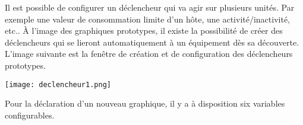 		Il est possible de configurer un déclencheur qui va agir sur plusieurs unités. Par exemple une valeur de consommation limite d'un hôte, une activité/inactivité, etc.. À l'image des graphiques prototypes, il existe la possibilité de créer des déclencheurs qui se lieront automatiquement à un équipement dès sa découverte. L'image suivante est la fenêtre de création et de configuration des déclencheurs prototypes.\\

	\begin{center}
		\texttt{[image: declencheur1.png]}
		\vspace{0.2cm}
	\end{center}

	Pour la déclaration d'un nouveau graphique, il y a à disposition six variables configurables.\\


